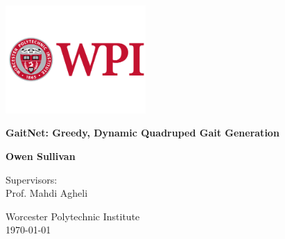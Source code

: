\documentclass{report}
\begin{document}
\begin{titlepage}
  \centering
  \vspace*{1cm}

  \includegraphics[width=0.4\textwidth]{images/wpi-logo.png}\par\vspace{1cm}

  \Huge
  \textbf{GaitNet: Greedy, Dynamic Quadruped Gait Generation}

  \vspace{0.5cm}
  \LARGE

  \vspace{1.5cm}

  \textbf{Owen Sullivan}

  \vfill

  \Large
  Supervisors: \\   Prof. Mahdi Agheli

  \vspace{0.8cm}

  \Large
  Worcester Polytechnic Institute \\   {\small \today}

\end{titlepage}

\newpage
{}
\setcounter{page}{1}

\newpage
\tableofcontents
\newpage
\listoffigures
\newpage
\listoftables
\newpage

\newpage


\newpage
\setcounter{page}{1}

\newpage


\newpage


\newpage


\newpage


\newpage



\renewcommand{\bibname}{References}



\newpage

\end{document}
